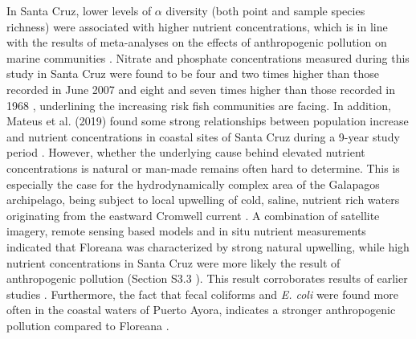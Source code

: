 \documentclass[jmse,article,accept,moreauthors,pdftex]{Definitions/mdpi}
\begin{document}
\begin{paracol}{2}
In Santa Cruz, lower levels of $\alpha$ diversity (both point and sample species richness) were associated with higher nutrient concentrations, which is in line with the results of meta-analyses on the effects of anthropogenic pollution on marine communities \citep{Johnston2009ContaminantsMeta-analysis}. Nitrate and phosphate concentrations measured during this study in Santa Cruz were found to be four and two times higher than those recorded in June 2007 \citep{Palacios2009Estudio2007.} and eight and seven times higher than those recorded in 1968 \citep{Houvenaghel1978OceanographicIslands}, underlining the increasing risk fish communities are facing. In addition, Mateus et al. (2019) found some strong relationships between population increase and nutrient concentrations in coastal sites of Santa Cruz during a 9-year study period \citep{Mateus2019AnArchipelago}. However, whether the underlying cause behind elevated nutrient concentrations is natural or man-made remains often hard to determine. This is especially the case for the hydrodynamically complex area of the Galapagos archipelago, being subject to local upwelling of cold, saline, nutrient rich waters originating from the eastward Cromwell current \citep{Houvenaghel1978OceanographicIslands,Mateus2019AnArchipelago,Schaeffer2008PhytoplanktonMeasurements}. A combination of satellite imagery, remote sensing based models and in situ nutrient measurements indicated that Floreana was characterized by strong natural upwelling, while high nutrient concentrations in Santa Cruz were more likely the result of anthropogenic pollution ({Section S3.3}%
). This result corroborates results of earlier studies \citep{Mateus2019AnArchipelago,Werdeman2006EffectsBays}. Furthermore, the fact that fecal coliforms and \textit{E. coli} were found more often in the coastal waters of Puerto Ayora, indicates a stronger anthropogenic pollution compared to Floreana \citep{Fernandez2008CoastalIsland,Stumpf2013InvestigatingEcuador}.



\end{paracol}
\end{document}
